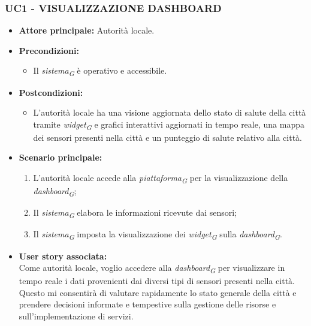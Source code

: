 \subsubsection{UC1 - VISUALIZZAZIONE DASHBOARD}
\begin{itemize}
    \item \textbf{Attore principale:} Autorità locale.
    \item \textbf{Precondizioni:}
        \begin{itemize}
            \item Il \textit{sistema}\textsubscript{\textit{G}} è operativo e accessibile.
        \end{itemize}
    \vspace{0,5cm}
    \item \textbf{Postcondizioni:}
    \begin{itemize}
        \item  L'autorità locale ha una visione aggiornata dello stato di salute della città tramite \textit{widget}\textsubscript{\textit{G}} e grafici interattivi aggiornati in tempo reale, una mappa dei sensori presenti nella città e un punteggio di salute relativo alla città.
    \end{itemize}
    \item \textbf{Scenario principale:}
        \begin{enumerate}
            \item L'autorità locale accede alla \textit{piattaforma}\textsubscript{\textit{G}} per la visualizzazione della \textit{dashboard}\textsubscript{\textit{G}};
            \item Il \textit{sistema}\textsubscript{\textit{G}} elabora le informazioni ricevute dai sensori;
            \item Il \textit{sistema}\textsubscript{\textit{G}} imposta la visualizzazione dei \textit{widget}\textsubscript{\textit{G}} sulla \textit{dashboard}\textsubscript{\textit{G}}.
        \end{enumerate}
    \item \textbf{User story associata:} \\
        Come autorità locale, voglio accedere alla \textit{dashboard}\textsubscript{\textit{G}} per visualizzare in tempo reale i dati provenienti dai diversi tipi di sensori presenti nella città. Questo mi consentirà di valutare rapidamente lo stato generale della città e prendere decisioni informate e tempestive sulla gestione delle risorse e sull'implementazione di servizi.
\end{itemize}